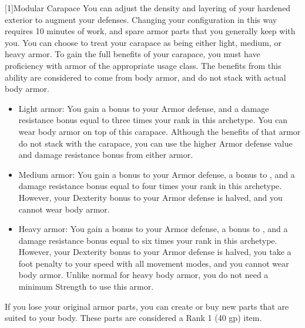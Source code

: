     [1]{Modular Carapace} You can adjust the density and layering of your hardened exterior to augment your defenses.
      Changing your configuration in this way requires 10 minutes of work, and spare armor parts that you generally keep with you.
      You can choose to treat your carapace as being either light, medium, or heavy armor.
      To gain the full benefits of your carapace, you must have proficiency with armor of the appropriate usage class.
      The benefits from this ability are considered to come from body armor, and do not stack with actual body armor.

      \begin{itemize}
        \item Light armor: You gain a  bonus to your Armor defense, and a damage resistance bonus equal to three times your rank in this archetype.
          You can wear body armor on top of this carapace.
          Although the benefits of that armor do not stack with the carapace, you can use the higher Armor defense value and damage resistance bonus from either armor.
        \item Medium armor: You gain a  bonus to your Armor defense, a  bonus to , and a damage resistance bonus equal to four times your rank in this archetype.
          However, your Dexterity bonus to your Armor defense is halved, and you cannot wear body armor.
        \item Heavy armor: You gain a  bonus to your Armor defense, a  bonus to , and a damage resistance bonus equal to six times your rank in this archetype.
          However, your Dexterity bonus to your Armor defense is halved, you take a  foot penalty to your speed with all movement modes, and you cannot wear body armor.
          Unlike normal for heavy body armor, you do not need a minimum Strength to use this armor.
      \end{itemize}

      If you lose your original armor parts, you can create or buy new parts that are suited to your body.
      These parts are considered a Rank 1 (40 gp) item.


